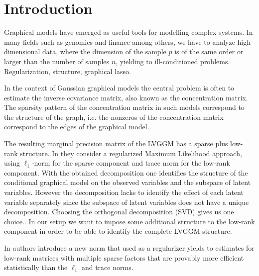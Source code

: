 \section{Introduction}
\label{intro}


Graphical models have emerged as useful tools for modelling complex systems. In many fields such as genomics and finance among others, we have to analyze high-dimensional data, where the dimension of the sample $p$ is of the same order or larger than the number of samples $n$, yielding to ill-conditioned problems. 
Regularization, structure, graphical lasso. 

In the context of Gaussian graphical models the central problem is often to estimate the inverse covariance matrix, also known as the concentration matrix. The sparsity pattern of the concentration matrix in such models correspond to the structure of the graph, i.e. the nonzeros of the concentration matrix correspond to the edges of the graphical model.. \\


The resulting marginal precision matrix of the LVGGM has a sparse plus low-rank structure. In \citet{chandrasekaran2010} they consider a regularized Maximum Likelihood approach, using $\ell_1$-norm for the sparse component and trace norm for the low-rank component. With the obtained decomposition one identifies the structure of the conditional graphical model on the observed variables and the subspace of latent variables. However the decomposition lacks to identify the effect of each latent variable separately since the subspace of latent variables does not have a unique decomposition. Choosing the orthogonal decomposition (SVD) gives us one choice.. In our setup we want to impose some additional structure to the low-rank component in order to be able to identify the complete LVGGM structure.  

In \citet{richard2014tight} authors introduce a new norm that used as a regularizer yields to  estimates for low-rank matrices with multiple sparse factors that are provably more efficient statistically than the $\ell_1$ and trace norms.

